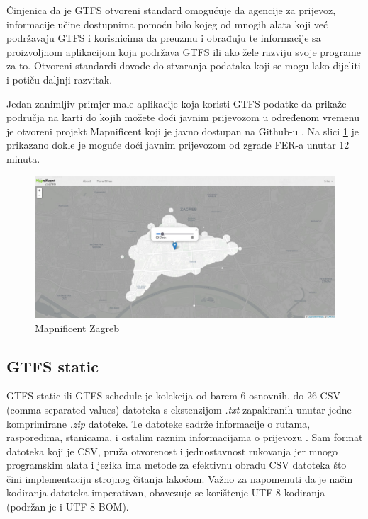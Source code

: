 \documentclass[zavrsnirad]{fer}
\begin{document}
Činjenica da je GTFS otvoreni standard omogućuje da agencije za prijevoz, informacije učine dostupnima pomoću bilo kojeg od mnogih alata koji već podržavaju GTFS i korisnicima da preuzmu i obrađuju te informacije sa proizvoljnom aplikacijom koja podržava GTFS ili ako žele razviju svoje programe za to. Otvoreni standardi dovode do stvaranja podataka koji se mogu lako dijeliti i potiču daljnji razvitak.

Jedan zanimljiv primjer male aplikacije koja koristi GTFS podatke da prikaže područja na karti do kojih možete doći javnim prijevozom u određenom vremenu je otvoreni projekt Mapnificent koji je javno dostupan na Github-u \cite{Mapnificent}. Na slici \ref{slk:mapnificent-zagreb} je prikazano dokle je moguće doći javnim prijevozom od zgrade FER-a unutar 12 minuta. 

\begin{figure}[htb]
  \centering
  \includegraphics[width=0.9\linewidth]{Figures/mapnificent-zagreb.jpg} 
  \caption{Mapnificent Zagreb}
  \label{slk:mapnificent-zagreb}
\end{figure}

\subsection{GTFS static}

GTFS static ili GTFS schedule je kolekcija od barem 6 osnovnih, do 26 CSV (comma-separated
values) datoteka s ekstenzijom \textit{.txt} zapakiranih unutar jedne komprimirane \textit{.zip} datoteke. Te datoteke
sadrže informacije o rutama, rasporedima, stanicama, i ostalim raznim informacijama o prijevozu \cite{GTFS-schedule}. Sam format datoteka koji je CSV, pruža otvorenost i jednostavnost rukovanja jer mnogo programskim alata i jezika ima metode za efektivnu obradu CSV datoteka što čini implementaciju strojnog čitanja lakoćom. Važno za napomenuti da je način kodiranja datoteka imperativan, obavezuje se korištenje UTF-8 kodiranja (podržan je i UTF-8 BOM).
\end{document}
